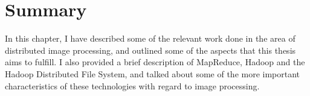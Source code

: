 \documentclass [12pt,a4paper]{report}
\begin{document}
\section{Summary}

In this chapter, I have described some of the relevant work done in the area of distributed image processing, and outlined some of the aspects that this thesis aims to fulfill. I also provided a brief description of MapReduce, Hadoop and the Hadoop Distributed File System, and talked about some of the more important characteristics of these technologies with regard to image processing.





\end{document}
